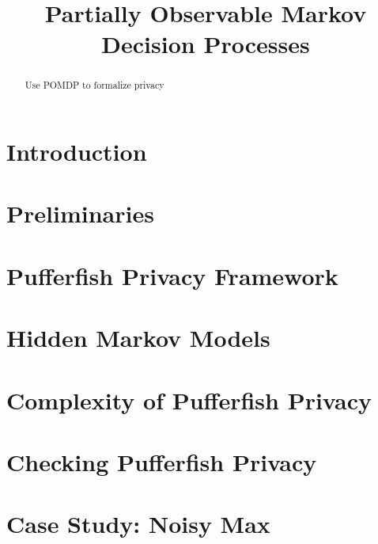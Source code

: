 \documentclass{llncs}
\title{Partially Observable Markov Decision Processes}
\begin{document}
\maketitle

\begin{abstract}
  Use POMDP to formalize privacy
\end{abstract}

\section{Introduction}
\label{section:introduction}


\section{Preliminaries}
\label{section:preliminaries}


\section{Pufferfish Privacy Framework}
\label{section:pufferfish}


\section{Hidden Markov Models}
\label{section:hmm}


\section{Complexity of Pufferfish Privacy}
\label{section:complexity}


\section{Checking Pufferfish Privacy}
\label{section:checking-pufferfish}


\section{Case Study: Noisy Max}
\label{section:noisy-max}




\end{document}
